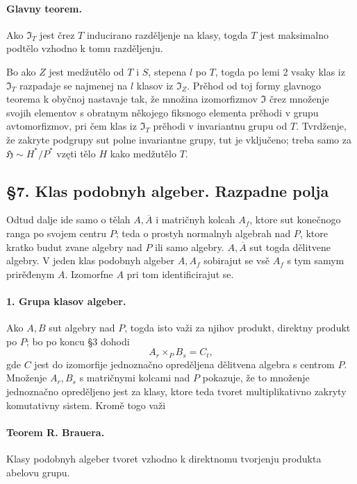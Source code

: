 \documentclass[11pt]{article}
\begin{document}
\paragraph{Glavny teorem.}
Ako \(\mathfrak I_T\) jest črez \(T\) inducirano razděljenje na klasy, togda \(T\) jest maksimalno podtělo vzhodno k tomu razděljenju.

Bo ako \(Z\) jest medžutělo od \(T\) i \(S\), stepena \(l\) po \(T\), togda po lemi 2 vsaky klas iz \(\mathfrak I_T\) razpadaje se najmenej na \(l\) klasov iz \(\mathfrak I_Z\). Prěhod od toj formy glavnogo teorema k obyčnoj nastavaje tak, že množina izomorfizmov \(\mathfrak I\) črez množenje svojih elementov s obratnym někojego fiksnogo elementa prěhodi v grupu avtomorfizmov, pri čem klas iz \(\mathfrak I_T\) prěhodi v invariantnu grupu od \(T\). Tvrdženje, že zakryte podgrupy sut polne invariantne grupy, tut je vključeno; treba samo za \(\mathfrak H\sim H^*/P^*\) vzęti tělo \(H\) kako medžutělo \(T\).

\subsection*{§7. Klas podobnyh algeber. Razpadne polja}

Odtud dalje ide samo o tělah \(A,\overline A\) i matričnyh kolcah \(A_f\), ktore sut konečnogo ranga po svojem centru \(P\); teda o prostyh normalnyh algebrah nad \(P\), ktore kratko budut zvane algebry nad \(P\) ili samo algebry. \(A,\overline A\) sut togda dělitvene algebry. V jeden klas podobnyh algeber \(A,A_f\) sobirajut se vsě \(A_f\) s tym samym prirěđenym \(A\). Izomorfne \(A\) pri tom identificirajut se.

\paragraph{1. Grupa klasov algeber.}
Ako \(A,B\) sut algebry nad \(P\), togda isto važi za njihov produkt, direktny produkt po \(P\); bo po koncu §3 dohodi
\[
        A_r\times_P B_s=C_t,
\]
gde \(C\) jest do izomorfije jednoznačno opreděljena dělitvena algebra s centrom \(P\). Množenje \(A_r,B_s\) s matričnymi kolcami nad \(P\) pokazuje, že to množenje jednoznačno opreděljeno jest za klasy, ktore teda tvoret multiplikativno zakryty komutativny sistem. Kromě togo važi

\paragraph{Teorem R. Brauera.}
Klasy podobnyh algeber tvoret vzhodno k direktnomu tvorjenju produkta abelovu grupu.
\end{document}
